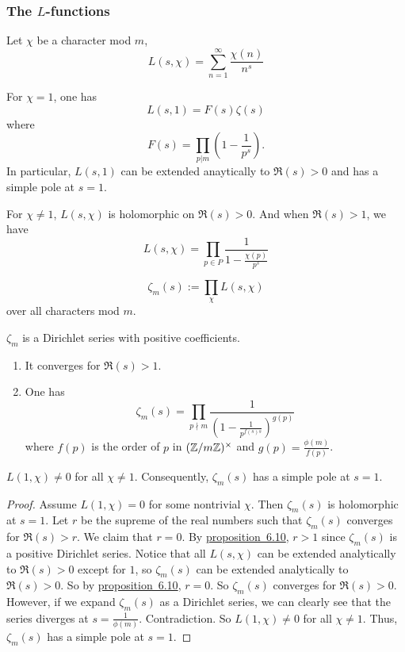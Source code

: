 \documentclass[15pt]{scrartcl}
\begin{document}
\subsubsection*{The $L$-functions}
\begin{definition}
    Let $\chi$ be a character mod $m$, 
    \[L(s,\chi)=\sum_{n=1}^\infty \frac{\chi(n)}{n^s}\]
\end{definition}
\begin{proposition}
    For $\chi=1$, one has 
    \[L(s,1)=F(s)\zeta(s)\]
    where \[F(s)=\prod_{p|m}\left(1-\frac{1}{p^s}\right).\]
    In particular, $L(s,1)$ can be extended anaytically to $\Re(s)>0$ and has a simple pole at $s=1$.
    
\end{proposition}
\begin{proposition}
    For $\chi\neq 1$, $L(s,\chi)$ is holomorphic on $\Re(s)>0$. And when $\Re(s)>1$, we have 
    \[L(s,\chi)=\prod_{p\in P}\frac{1}{1-\frac{\chi(p)}{p^s}}\]
\end{proposition}
\begin{definition}
    \[\zeta_m(s):=\prod_{\chi}L(s,\chi)\]
    over all characters mod $m$. 
\end{definition}
\begin{proposition}
    $\zeta_m$ is a Dirichlet series with positive coefficients.
    \begin{enumerate}
        \item It converges for $\Re(s)>1$. 
        \item One has 
        \[\zeta_m(s)=\prod_{p\nmid m}\frac{1}{(1-\frac{1}{p^{f(s)s}})^{g(p)}}\]
        where $f(p)$ is the order of $p$ in $(\mathbb Z/m\mathbb Z)^\times$ and $g(p)=\frac{\phi(m)}{f(p)}$.
    \end{enumerate}
\end{proposition}
\begin{theorem}
    $L(1,\chi)\neq 0$ for all $\chi\neq 1$. Consequently, $\zeta_m(s)$ has a simple pole at $s=1$.
\end{theorem}
\begin{proof}
    Assume $L(1,\chi)=0$ for some nontrivial $\chi$. Then $\zeta_m(s)$ is holomorphic at $s=1$. Let $r$ be the supreme of the real numbers such that $\zeta_m(s)$ converges for $\Re(s)>r$. We claim that $r=0$. By \hyperref[prop:6.10]{proposition~6.10}, $r>1$ since $\zeta_m(s)$ is a positive Dirichlet series. Notice that all $L(s,\chi)$ can be extended analytically to $\Re(s)>0$ except for $1$, so $\zeta_m(s)$ can be extended analytically to $\Re(s)>0$. So by \hyperref[prop:6.10]{proposition~6.10}, $r=0$. So $\zeta_m(s)$ converges for $\Re(s)>0$. 
    \\

    However, if we expand $\zeta_m(s)$ as a Dirichlet series, we can clearly see that the series diverges at $s=\frac{1}{\phi(m)}$. Contradiction. So $L(1,\chi)\neq 0$ for all $\chi\neq 1$. Thus, $\zeta_m(s)$ has a simple pole at $s=1$.
\end{proof}
\end{document}
